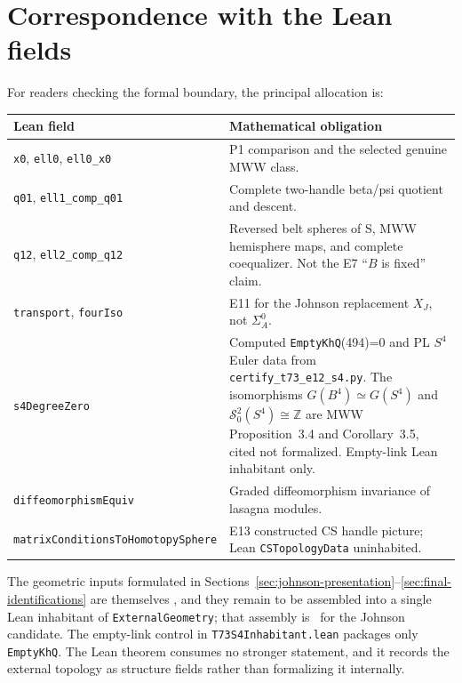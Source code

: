 \section{Correspondence with the Lean fields}\label{app:lean-fields}

For readers checking the formal boundary, the principal allocation is:
\begin{center}
\small
\begin{tabularx}{\textwidth}{@{}l X@{}}
\toprule
Lean field & Mathematical obligation \\
\midrule
\texttt{x0}, \texttt{ell0}, \texttt{ell0\_x0} & P1 comparison and the selected genuine MWW class. \\
\texttt{q01}, \texttt{ell1\_comp\_q01} & Complete two-handle beta/psi quotient and descent. \\
\texttt{q12}, \texttt{ell2\_comp\_q12} & Reversed belt spheres of S, MWW hemisphere maps, and complete coequalizer.  Not the E7 ``$B$ is fixed'' claim. \\
\texttt{transport}, \texttt{fourIso} & E11 for the Johnson replacement $X_J$, not $\Sigma_A^0$. \\
\texttt{s4DegreeZero} & Computed \texttt{EmptyKhQ}(494)=0 and PL $S^4$ Euler data from \texttt{certify\_t73\_e12\_s4.py}.  The isomorphisms $G(B^4)\simeq G(S^4)$ and $\mathcal S^2_0(S^4)\cong\mathbb Z$ are MWW Proposition~3.4 and Corollary~3.5, cited not formalized.  Empty-link Lean inhabitant only. \\
\texttt{diffeomorphismEquiv} & Graded diffeomorphism invariance of lasagna modules. \\
\texttt{matrixConditionsToHomotopySphere} & E13 constructed CS handle picture; Lean \texttt{CSTopologyData} uninhabited. \\
\bottomrule
\end{tabularx}
\end{center}

The geometric inputs formulated in Sections~\ref{sec:johnson-presentation}--\ref{sec:final-identifications}
are themselves \Open, and they remain to be assembled into a single Lean
inhabitant of \texttt{ExternalGeometry}; that assembly is \Open\ for the Johnson candidate.
The empty-link control in \texttt{T73S4Inhabitant.lean} packages only
\texttt{EmptyKhQ}.  The Lean theorem consumes no stronger statement, and it
records the external topology as structure fields rather than formalizing it
internally.



